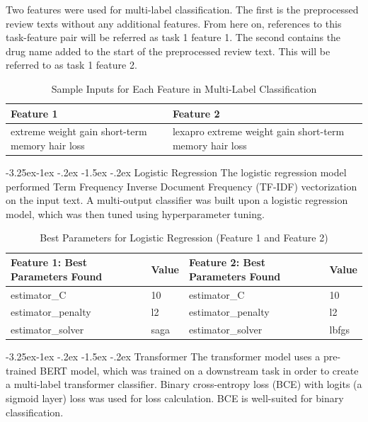 \documentclass[10.7pt, onecolumn]{article}
\makeatletter
\renewcommand\subsubsection{\@startsection{subsubsection}{3}{\z@}%
	{-3.25ex\@plus -1ex \@minus -.2ex}%
    {-1.5ex \@plus -.2ex}%
    {\normalfont\itshape}}
\makeatother
\begin{document}
Two features were used for multi-label classification. The first is the preprocessed review texts without any additional features. From here on, references to this task-feature pair will be referred as task 1 feature 1. The second contains the drug name added to the start of the preprocessed review text. This will be referred to as task 1 feature 2.

\begin{table}[H]
  \centering
  \small
  \begin{tabular}{|p{5cm}|p{5cm}|p{5cm}|}
    \hline
    \textbf{Feature 1} & \textbf{Feature 2} \\
    \hline
    extreme weight gain short-term memory hair loss & lexapro extreme weight gain short-term memory hair loss\\
    \hline
  \end{tabular}
  \caption{Sample Inputs for Each Feature in Multi-Label Classification}
  \label{tab:multiclassInput}
\end{table}

\subsubsection{Logistic Regression}
The logistic regression model performed Term Frequency Inverse Document Frequency (TF-IDF) vectorization on the input text. A multi-output classifier was built upon a logistic regression model, which was then tuned using hyperparameter tuning.

\begin{table}[H]
  \centering
  \small
  \begin{tabular}{|p{4cm}|p{4cm}|p{4cm}|p{4cm}|}
    \hline
    \textbf{Feature 1: Best Parameters Found} & \textbf{Value} & \textbf{Feature 2: Best Parameters Found} & \textbf{Value} \\
    \hline
    estimator\_C & 10 & estimator\_C & 10 \\
    \hline
    estimator\_penalty & l2 & estimator\_penalty & l2 \\
    \hline
    estimator\_solver & saga & estimator\_solver & lbfgs \\
    \hline
  \end{tabular}
  \caption{Best Parameters for Logistic Regression (Feature 1 and Feature 2)}
  \label{tab:feature12Params}
\end{table}

\subsubsection{Transformer}
The transformer model uses a pre-trained BERT model, which was trained on a downstream task in order to create a multi-label transformer classifier. Binary cross-entropy loss (BCE) with logits (a sigmoid layer) loss was used for loss calculation. BCE is well-suited for binary classification\cite{xu2023learning}. 
\end{document}
